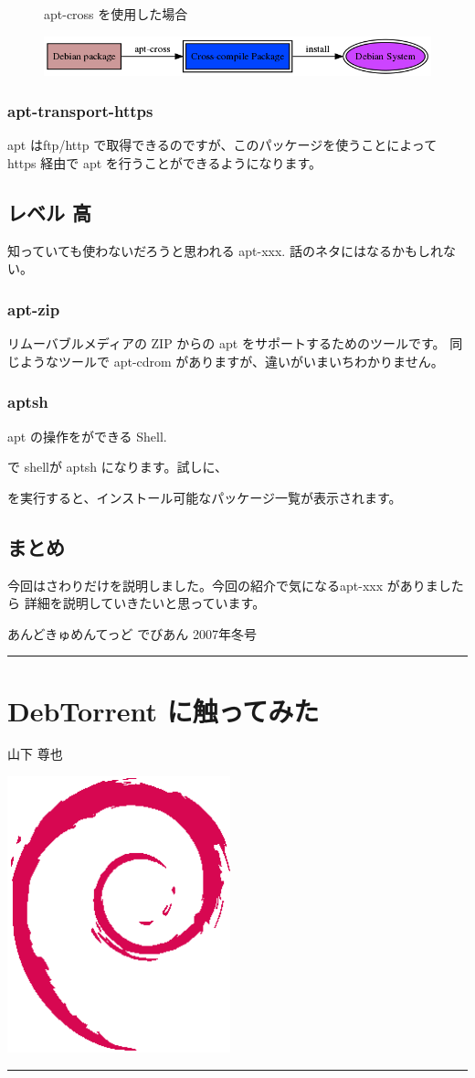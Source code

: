 \documentclass[mingoth,a4paper]{jsarticle}
\renewcommand{\dancersection}[2]{%
\newpage
あんどきゅめんてっど でびあん 2007年冬号
%
\vspace{0.1mm}\\
{\color{dancerlightblue}\rule{\hsize}{2mm}}

%
%
\begin{minipage}[t]{0.7\hsize}
\color{dancerdarkblue}
\vspace{1cm}
\section{#1}
\hfill{}#2\\
\end{minipage}
\begin{minipage}[t]{0.3\hsize}
\vspace{-2cm}
\hfill{}\includegraphics[height=8cm]{image200502/openlogo-nd.eps}\\
\vspace{-5cm}
\end{minipage}
%
%
{\color{dancerdarkblue}\rule{0.74\hsize}{2mm}}
%
\vspace{2cm}
}
\begin{document}
 \begin{figure}[h]
 \begin{center}
apt-cross を使用した場合

 \includegraphics[width=12cm]{image200709/apt-cross-e.png}
 \end{center}
 \end{figure}

\subsubsection{apt-transport-https}
 apt はftp/http で取得できるのですが、このパッケージを使うことによって
 https 経由で apt を行うことができるようになります。
\subsection{レベル 高}
 知っていても使わないだろうと思われる apt-xxx.
 話のネタにはなるかもしれない。
\subsubsection{apt-zip}
 リムーバブルメディアの ZIP からの apt をサポートするためのツールです。
 同じようなツールで apt-cdrom がありますが、違いがいまいちわかりません。

\subsubsection{aptsh}
 apt の操作をができる Shell.
\begin{commandline}
\end{commandline} 
 で shellが aptsh になります。試しに、
\begin{commandline}
\end{commandline}
 を実行すると、インストール可能なパッケージ一覧が表示されます。
 
\subsection{まとめ}
今回はさわりだけを説明しました。今回の紹介で気になるapt-xxx がありましたら
詳細を説明していきたいと思っています。

\dancersection{DebTorrent に触ってみた}{山下 尊也}
\end{document}
